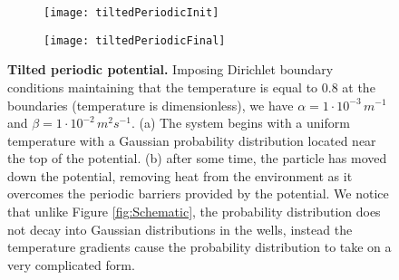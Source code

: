 \begin{figure}
	\begin{subfigure}{0.49\textwidth}
		\texttt{[image: tiltedPeriodicInit]}
	\end{subfigure}
	\begin{subfigure}{0.49\textwidth}
		\texttt{[image: tiltedPeriodicFinal]}
	\end{subfigure}
	\caption{\textbf{Tilted periodic potential.} Imposing Dirichlet boundary conditions maintaining that the temperature is equal to 0.8 at the boundaries (temperature is dimensionless), we have $\alpha = 1 \cdot 10^{-3} \, m^{-1}$ and $\beta = 1 \cdot 10^{-2}  \, m^2 s^{-1}$. (a) The system begins with a uniform temperature with a Gaussian probability distribution located near the top of the potential. (b) after some time, the particle has moved down the potential, removing heat from the environment as it overcomes the periodic barriers provided by the potential. We notice that unlike Figure \ref{fig:Schematic}, the probability distribution does not decay into Gaussian distributions in the wells, instead the temperature gradients cause the probability distribution to take on a very complicated form. \label{fig:tiltedPeriodic}}
\end{figure}